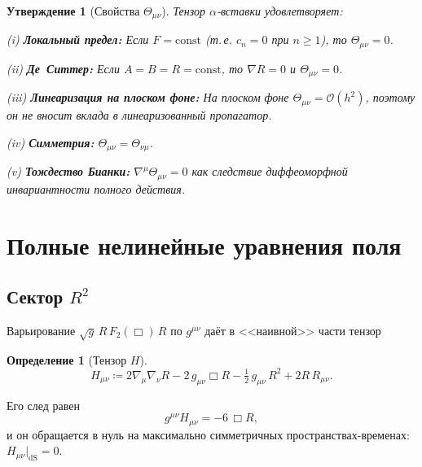 \documentclass[12pt,a4paper]{article}
\newcommand{\order}{\mathcal{O}}
\theoremstyle{plain}
\newtheorem{proposition}[theorem]{Утверждение}
\theoremstyle{definition}
\newtheorem{definition}[theorem]{Определение}
\begin{document}
\begin{proposition}[Свойства $\Theta_{\mu\nu}$]
\label{prop:theta-props}
Тензор $\alpha$-вставки удовлетворяет:\smallskip

\noindent
(i) \textbf{Локальный предел:}  Если $F = \mathrm{const}$ (т.\,е.
$c_n = 0$ при $n \geq 1$), то $\Theta_{\mu\nu} = 0$.\smallskip

\noindent
(ii) \textbf{Де~Ситтер:}  Если $A = B = R = \mathrm{const}$, то
$\nabla R = 0$ и $\Theta_{\mu\nu} = 0$.\smallskip

\noindent
(iii) \textbf{Линеаризация на плоском фоне:}  На плоском фоне
$\Theta_{\mu\nu} = \order(h^2)$, поэтому он не вносит вклада в
линеаризованный пропагатор.\smallskip

\noindent
(iv) \textbf{Симметрия:}  $\Theta_{\mu\nu} = \Theta_{\nu\mu}$.\smallskip

\noindent
(v) \textbf{Тождество Бианки:}  $\nabla^\mu\Theta_{\mu\nu} = 0$
как следствие диффеоморфной инвариантности полного действия.
\end{proposition}

\section{Полные нелинейные уравнения поля}
\label{sec:field-equations}

\subsection{Сектор \texorpdfstring{$R^2$}{R2}}

Варьирование $\sqrt{g}\,R\,F_2(\Box)\,R$ по $g^{\mu\nu}$ даёт в
<<наивной>> части тензор

\begin{definition}[Тензор $H$]
\label{def:H-tensor}
\begin{equation}\label{eq:H-def}
  H_{\mu\nu} \coloneqq 2\nabla_\mu\nabla_\nu R
  - 2\,g_{\mu\nu}\Box R
  - \tfrac{1}{2}\,g_{\mu\nu}\,R^2
  + 2R\,R_{\mu\nu}.
\end{equation}
\end{definition}

\noindent
Его след равен
\begin{equation}\label{eq:H-trace}
  g^{\mu\nu}H_{\mu\nu} = -6\,\Box R,
\end{equation}
и он обращается в нуль на максимально симметричных пространствах-временах:
$H_{\mu\nu}|_{\mathrm{dS}} = 0$.
\end{document}
